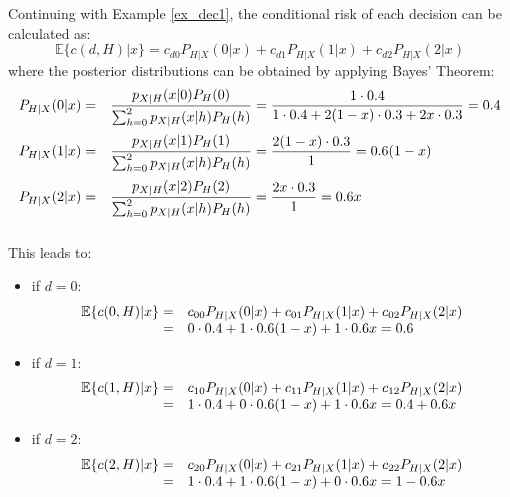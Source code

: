 \begin{example} \label{ex_dec2}
Continuing with Example \ref{ex_dec1}, the conditional risk of each decision can be calculated as:
$$\mathbb{E}\{c(d,H)|x\}=  c_{d0} P_{H|X}(0|x) +  c_{d1} P_{H|X}(1|x) + c_{d2} P_{H|X}(2|x) $$
where the posterior distributions can be obtained by applying Bayes' Theorem:
$$\begin{array}{rl} \vspace{0.2cm}
P_{H|X}(0|x) =& \displaystyle \frac{p_{X|H}(x|0) P_H(0)}{\sum_{h=0}^{2} p_{X|H}(x|h) P_H(h) }= \frac{1 \cdot 0.4} { 1 \cdot 0.4 + 2(1-x) \cdot 0.3 + 2x \cdot 0.3} =0.4 \\ \vspace{0.2cm}
P_{H|X}(1|x) =& \displaystyle \frac{p_{X|H}(x|1) P_H(1)}{\sum_{h=0}^{2} p_{X|H}(x|h) P_H(h) }= \frac{2(1-x)\cdot 0.3} { 1 } =0.6(1-x) \\ \vspace{0.2cm}
P_{H|X}(2|x) = &\displaystyle  \frac{p_{X|H}(x|2) P_H(2)}{\sum_{h=0}^{2} p_{X|H}(x|h) P_H(h) }= \frac{2x\cdot 0.3} { 1 } =0.6x  \vspace{0.2cm}
\end{array} $$
This leads to:

\begin{itemize}
\item if $d=0$:
$$\begin{array}{rl} 
\mathbb{E}\{c(0,H)|x\} =& c_{00} P_{H|X}(0|x) +  c_{01} P_{H|X}(1|x) + c_{02} P_{H|X}(2|x) \\
                =& 0 \cdot 0.4+ 1 \cdot 0.6(1-x) + 1 \cdot 0.6x= 0.6 
\end{array}$$
\item if $d=1$:
$$\begin{array}{rl} 
\mathbb{E}\{c(1,H)|x\} =& c_{10} P_{H|X}(0|x) + c_{11} P_{H|X}(1|x) + c_{12} P_{H|X}(2|x) \\
                =& 1 \cdot 0.4+ 0 \cdot 0.6(1-x) + 1 \cdot 0.6x= 0.4+0.6x 
\end{array}$$
\item if  $d=2$:
$$\begin{array}{rl} 
\mathbb{E}\{c(2,H)|x\} =&  c_{20} P_{H|X}(0|x) +  c_{21} P_{H|X}(1|x) + c_{22} P_{H|X}(2|x) \\
                =& 1 \cdot 0.4+ 1 \cdot 0.6(1-x) + 0 \cdot 0.6x=  1-0.6x 
\end{array}$$
\end{itemize} 
\end{example}

